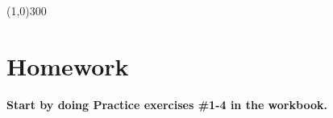 \begin{center}
\line(1,0){300} %
\end{center}

\section*{Homework}

\noindent \textbf{Start by doing Practice exercises \#1-4 in the workbook.}

\bigskip